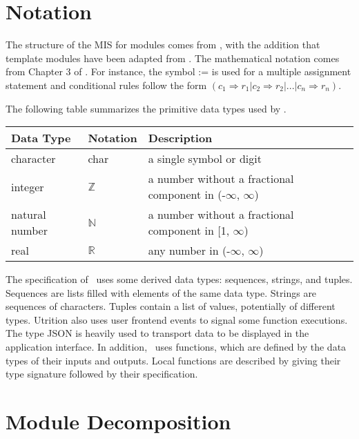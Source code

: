 \documentclass[12pt, titlepage]{article}
\begin{document}
\section{Notation}


The structure of the MIS for modules comes from \citet{HoffmanAndStrooper1995},
with the addition that template modules have been adapted from
\cite{GhezziEtAl2003}.  The mathematical notation comes from Chapter 3 of
\citet{HoffmanAndStrooper1995}.  For instance, the symbol := is used for a
multiple assignment statement and conditional rules follow the form $(c_1
\Rightarrow r_1 | c_2 \Rightarrow r_2 | ... | c_n \Rightarrow r_n )$.

The following table summarizes the primitive data types used by \progname. 

\begin{center}
\renewcommand{\arraystretch}{1.2}
\noindent 
\begin{tabular}{l l p{7.5cm}} 
\toprule 
\textbf{Data Type} & \textbf{Notation} & \textbf{Description}\\ 
\midrule
character & char & a single symbol or digit\\
integer & $\mathbb{Z}$ & a number without a fractional component in (-$\infty$, $\infty$) \\
natural number & $\mathbb{N}$ & a number without a fractional component in [1, $\infty$) \\
real & $\mathbb{R}$ & any number in (-$\infty$, $\infty$)\\
\bottomrule
\end{tabular} 
\end{center}

\noindent
The specification of \progname \ uses some derived data types: sequences, strings, and
tuples. Sequences are lists filled with elements of the same data type. Strings
are sequences of characters. Tuples contain a list of values, potentially of
different types. Utrition also uses user frontend events to signal some function executions. The type JSON is heavily used to transport data to be displayed in the application interface. In addition, \progname \ uses functions, which
are defined by the data types of their inputs and outputs. Local functions are
described by giving their type signature followed by their specification.

\section{Module Decomposition}
\end{document}
